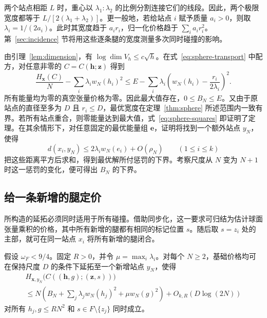 两个站点相距 \(L\) 时，重心以 \(\lambda_1:\lambda_2\) 的比例分割连接它们的线段。因此，两个极限宽度都等于 \(L/[2(\lambda_1+\lambda_2)]\)。更一般地，若给站点 \(i\) 赋予质量 \(a_i>0\)，则取 \(\lambda_i=1/(2a_i)\)。此时其宽度趋于 \(a_i r_i\)，归一化价格趋于 \(\sum_i a_i r_i^2\)。第~\ref{sec:incidence} 节将用这些逐条腿的宽度测量多次同时碰撞的影响。

由引理~\ref{lem:dimension}，有 \(\log\dim V_h\le c\sqrt h\)。在式~\eqref{eq:sphere-transport} 中配方，对任意非零的 \(C=C(\mathbf h;\mathbf z)\) 得到
\begin{equation}\label{eq:sphere-squares}
 \frac{H_{\mathbf x}(C)}{N}-\sum_i\lambda_i w_N(h_i)^2
 \le E-\sum_i\lambda_i
             \left(w_N(h_i)-\frac{r_i}{2\lambda_i}\right)^2 .
\end{equation}
所有能量均为零的真空张量价格为零。因此最大值存在，\(0\le B_N\le E\)。又由于原站点的直径至多为 \(D\) 且 \(r_i\le D\)，最优宽度在定理~\ref{thm:sphere} 所述范围内一致有界。若所有站点重合，则零能量达到最大值，式~\eqref{eq:sphere-squares} 即证明了定理。在其余情形下，对任意固定的最优能量组 \(\mathbf e\)，证明将找到一个额外站点 \(y_N\)，使得
\[
 d(x_i,y_N)\le 2\lambda_i w_N(e_i)+O(\rho_N)\qquad(1\le i\le k)
\]
把这些距离平方后求和，得到最优解所付惩罚的下界。考察尺度从 \(N\) 变为 \(N+1\) 时这一惩罚的变化，便可得出 \(B_N\) 的下界。

\subsection{给一条新增的腿定价}

所构造的延拓必须同时适用于所有碰撞。借助同步化，这一要求可归结为估计球面张量乘积的价格，其中所有新增的腿都有相同的标记位置 \(s\)。随后取 \(s=z_i\) 处的主部，就可在同一站点 \(x_i\) 将所有新增的腿闭合。

\begin{lemma}\label{lem:sphere-added}
假设 \(\omega_F<9/4\)。固定 \(R>0\)，并令 \(\mu=\max_i\lambda_i\)。对每个 \(N\ge2\)，基础价格均可在保持尺度 \(D\) 的条件下延拓至一个新增站点 \(y_N\)，使得
\begin{multline}\label{eq:sphere-aux}
 H_{\mathbf x,y_N}\bigl(C((\mathbf h,g);(\mathbf z,s))\bigr)\\
 \le N\left(B_N+\sum_j\lambda_j w_N(h_j)^2+\mu w_N(g)^2\right)
       + O_{k,R}(D\log(2N))
\end{multline}
对所有 \(h_j,g\le RN^2\) 和 \(s\in F\setminus\{z_j\}\) 同时成立。
\end{lemma}

